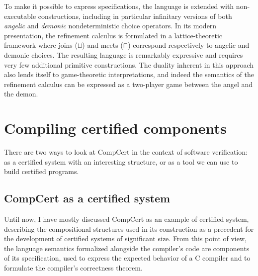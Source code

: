 \documentclass[11pt,oneside,draft]{book}
\theoremstyle{definition}
\begin{document}
To make it possible to express specifications,
the language is extended with non-executable constructions,
including in particular infinitary versions of both
\emph{angelic} and \emph{demonic} nondeterministic choice operators.
In its modern presentation,
the refinement calculus is formulated in a lattice-theoretic framework
where joins ($\sqcup$) and meets ($\sqcap$)
correspond respectively to angelic and demonic choices.
The resulting language is remarkably expressive
and requires very few additional primitive constructions.
The duality inherent in this approach
also lends itself to game-theoretic interpretations,
and indeed the semantics of the refinement calculus
can be expressed as a two-player game between
the angel and the demon.

%



\section{Compiling certified components} %

There are two ways to look at CompCert
in the context of software verification:
as a certified system
with an interesting structure,
or as a tool
we can use to build certified programs.

\subsection{CompCert as a certified system}

Until now,
I have mostly discussed
CompCert as an example of certified system,
describing the compositional structures used in
its construction as a precedent for the development of
certified systems of significant size.
From this point of view,
the language semantics
formalized alongside the compiler's code
are components of its specification,
used to express the expected behavior of
a C compiler
and to formulate the compiler's correctness theorem.
\end{document}
